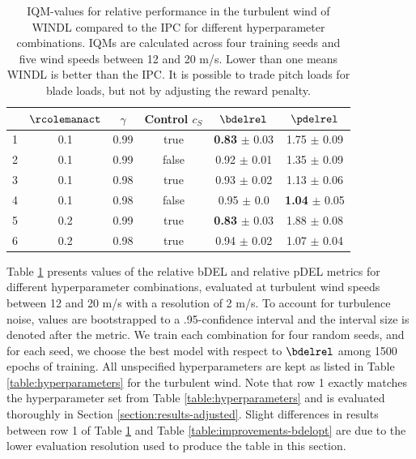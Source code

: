 \begin{table}
  \centering
  \begin{tabular}{rccc@{\hskip 1.5cm}cc}
    \toprule
    & $\rcolemanact$ & $\gamma$ & Control $c_S$ & $\bdelrel$ & $\pdelrel$ \\
    \midrule
    1 & 0.1 & 0.99 & true & \textbf{0.83} $\pm$ 0.03 & 1.75 $\pm$ 0.09 \\
    2 & 0.1 & 0.99 & false & 0.92 $\pm$ 0.01 & 1.35 $\pm$ 0.09 \\
    3 & 0.1 & 0.98 & true & 0.93 $\pm$ 0.02 & 1.13 $\pm$ 0.06 \\
    4 & 0.1 & 0.98 & false & 0.95 $\pm$ 0.0  & \textbf{1.04} $\pm$ 0.05 \\

    
    5 & 0.2 & 0.99 & true & \textbf{0.83} $\pm$ 0.03 & 1.88 $\pm$ 0.08 \\
    6 & 0.2 & 0.98 & true & 0.94 $\pm$ 0.02 & 1.07 $\pm$ 0.04 \\


    \bottomrule
  \end{tabular}
  \caption{\acs{IQM}-values for relative performance in the turbulent wind of WINDL compared to the IPC for different hyperparameter combinations. IQMs are calculated across four training seeds and five wind speeds between 12 and 20 m/s. Lower than one means WINDL is better than the IPC. It is possible to trade pitch loads for blade loads, but not by adjusting the reward penalty.}
  \label{table:pb-trade-turbulent}
\end{table}

Table \ref{table:pb-trade-turbulent} presents values of the relative bDEL and relative pDEL metrics for different hyperparameter combinations, evaluated at turbulent wind speeds between 12 and 20 m/s with a resolution of 2 m/s. To account for turbulence noise, values are bootstrapped to a .95-confidence interval and the interval size is denoted after the metric. We train each combination for four random seeds, and for each seed, we choose the best model with respect to $\bdelrel$ among 1500 epochs of training. All unspecified hyperparameters are kept as listed in Table \ref{table:hyperparameters} for the turbulent wind. Note that row 1 exactly matches the hyperparameter set from Table \ref{table:hyperparameters} and is evaluated thoroughly in Section \ref{section:results-adjusted}. Slight differences in results between row 1 of Table \ref{table:pb-trade-turbulent} and Table \ref{table:improvements-bdelopt} are due to the lower evaluation resolution used to produce the table in this section.

